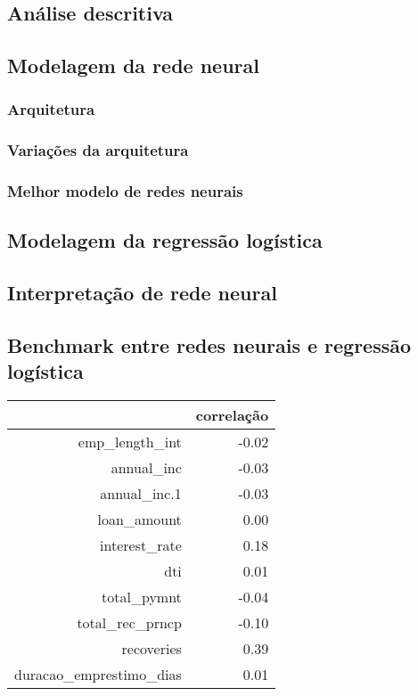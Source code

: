 \subsection*{Análise descritiva}
\subsection*{Modelagem da rede neural}
\subsubsection*{Arquitetura}
\subsubsection*{Variações da arquitetura}
\subsubsection*{Melhor modelo de redes neurais}

\subsection*{Modelagem da regressão logística}

\subsection*{Interpretação de rede neural}

\subsection*{Benchmark entre redes neurais e regressão logística}

\begin{table}[ht]
\centering
\begin{tabular}{rr}
  \hline
 & correlação \\ 
  \hline
emp\_length\_int & -0.02 \\ 
  annual\_inc & -0.03 \\ 
  annual\_inc.1 & -0.03 \\ 
  loan\_amount & 0.00 \\ 
  interest\_rate & 0.18 \\ 
  dti & 0.01 \\ 
  total\_pymnt & -0.04 \\ 
  total\_rec\_prncp & -0.10 \\ 
  recoveries & 0.39 \\ 
  duracao\_emprestimo\_dias & 0.01 \\ 
   \hline
\end{tabular}
\end{table}

